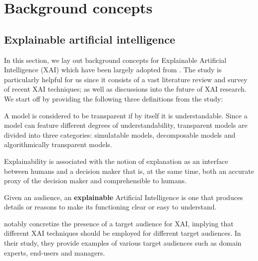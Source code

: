 \chapter{Background concepts}

\label{background}

\section{Explainable artificial intelligence}

In this section, we lay out background concepts for Explainable Artificial Intelligence (XAI) which have been largely adopted from \citet{arrieta2020explainable}. The study is particularly helpful for us since it consists of a vast literature review and survey of recent XAI techniques; as well as discussions into the future of XAI research. We start off by providing the following three definitions from the study:

\begin{definition}
  A model is considered to be transparent if by itself it is understandable. Since a model can feature different degrees of understandability, transparent models \textelp{} are divided into three categories: simulatable models, decomposable models and algorithmically transparent models. 
\end{definition}

\begin{definition}
  Explainability is associated with the notion of explanation as an interface between humans and a decision maker that is, at the same time, both an accurate proxy of the decision maker and comprehensible to humans. 
\end{definition}

\begin{definition}
  Given an audience, an \textbf{explainable} Artificial Intelligence is one that produces details or reasons to make its functioning clear or easy to understand.
\end{definition}

\citet{arrieta2020explainable} notably concretize the presence of a target audience for XAI, implying that different XAI techniques should be employed for different target audiences. In their study, they provide examples of various target audiences such as domain experts, end-users and managers.

